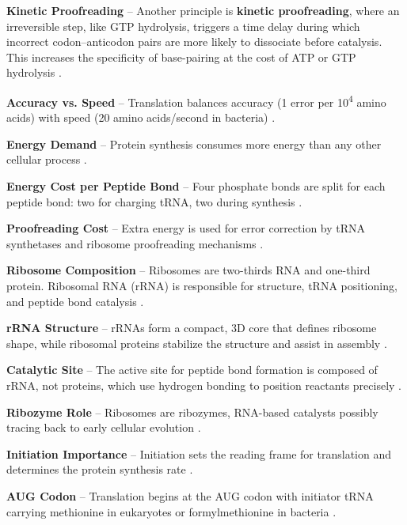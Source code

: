 \textbf{Kinetic Proofreading} – Another principle is \textbf{kinetic proofreading}, where an irreversible step, like GTP hydrolysis, triggers a time delay during which incorrect codon–anticodon pairs are more likely to dissociate before catalysis. This increases the specificity of base-pairing at the cost of ATP or GTP hydrolysis \cite*{L1-Chapter6}.


\textbf{Accuracy vs. Speed} – Translation balances accuracy (1 error per 10\textsuperscript{4} amino acids) with speed (20 amino acids/second in bacteria) \cite*{L1-Chapter6}.

\textbf{Energy Demand} – Protein synthesis consumes more energy than any other cellular process \cite*{L1-Chapter6}.

\textbf{Energy Cost per Peptide Bond} – Four phosphate bonds are split for each peptide bond: two for charging tRNA, two during synthesis \cite*{L1-Chapter6}.

\textbf{Proofreading Cost} – Extra energy is used for error correction by tRNA synthetases and ribosome proofreading mechanisms \cite*{L1-Chapter6}.


\textbf{Ribosome Composition} – Ribosomes are two-thirds RNA and one-third protein. Ribosomal RNA (rRNA) is responsible for structure, tRNA positioning, and peptide bond catalysis \cite*{L1-Chapter6}.

\textbf{rRNA Structure} – rRNAs form a compact, 3D core that defines ribosome shape, while ribosomal proteins stabilize the structure and assist in assembly \cite*{L1-Chapter6}.

\textbf{Catalytic Site} – The active site for peptide bond formation is composed of rRNA, not proteins, which use hydrogen bonding to position reactants precisely \cite*{L1-Chapter6}.

\textbf{Ribozyme Role} – Ribosomes are ribozymes, RNA-based catalysts possibly tracing back to early cellular evolution \cite*{L1-Chapter6}.



\textbf{Initiation Importance} – Initiation sets the reading frame for translation and determines the protein synthesis rate \cite*{L1-Chapter6}.

\textbf{AUG Codon} – Translation begins at the AUG codon with initiator tRNA carrying methionine in eukaryotes or formylmethionine in bacteria \cite*{L1-Chapter6}.

